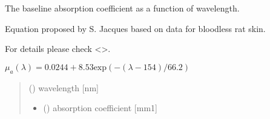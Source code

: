 \documentclass[letterpaper,10pt,english]{sphinxmanual}
\begin{document}
\begin{fulllineitems}
\label{\detokenize{03_absorption_coefficient:skinoptics.absorption_coefficient.mua_baseline}}
\pysigstartsignatures
{}
\pysigstopsignatures
\begin{DUlineblock}{0em}
\item[] The baseline absorption coefficient as a function of wavelength.
\item[] Equation proposed by S. Jacques based on data for bloodless rat skin.
\item[] For details please check \textless{}\textgreater{}.
\end{DUlineblock}

\sphinxAtStartPar
\(\mu_a(\lambda) = 0.0244 + 8.53\mbox{exp}(-(\lambda-154)/66.2)\)
\begin{quote}\begin{description}
\sphinxAtStartPar
{} () \textendash{} wavelength {[}nm{]}

\sphinxAtStartPar
\begin{itemize}
\item {} 
\sphinxAtStartPar
{} () \textendash{} absorption coefficient {[}mm\sphinxhyphen{}1{]}

\end{itemize}


\end{description}\end{quote}

\end{fulllineitems}

\end{document}
